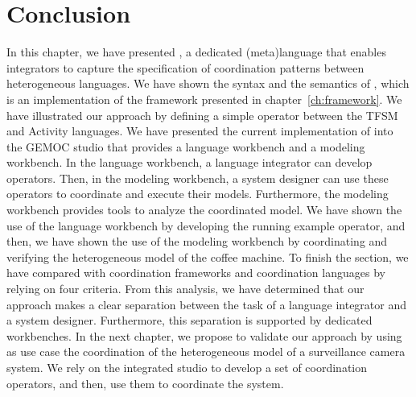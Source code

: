 \section{Conclusion}
In this chapter, we have presented \bcool, a dedicated (meta)language that enables integrators to capture the specification of coordination patterns between heterogeneous languages. We have shown the syntax and the semantics of \bcool, which is an implementation of the framework presented in chapter~\ref{ch:framework}. We have illustrated our approach by defining a simple operator between the TFSM and Activity languages. We have presented the current implementation of \bcool into the GEMOC studio that provides a language workbench and a modeling workbench. In the language workbench, a language integrator can develop \bcool operators. Then, in the modeling workbench, a system designer can use these operators to coordinate and execute their models. Furthermore, the modeling workbench provides tools to analyze the coordinated model. We have shown the use of the language workbench by developing the running example operator, and then, we have shown the use of the modeling workbench by coordinating and verifying the heterogeneous model of the coffee machine. To finish the section, we have compared \bcool with coordination frameworks and coordination languages by relying on four criteria. From this analysis, we have determined that our approach makes a clear separation between the task of a language integrator and a system designer. Furthermore, this separation is supported by dedicated workbenches. In the next chapter, we propose to validate our approach by using as use case the coordination of the heterogeneous model of a surveillance camera system. We rely on the integrated studio to develop a set of coordination operators, and then, use them to coordinate the system. 



